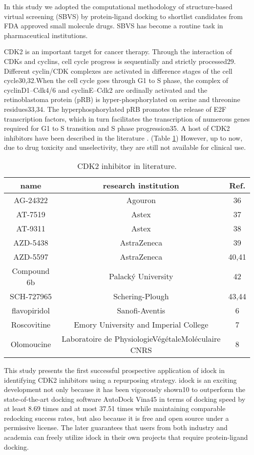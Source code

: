 In this study we adopted the computational methodology of structure-based virtual screening (SBVS) by protein-ligand docking to shortlist candidates from FDA approved small molecule drugs. SBVS has become a routine task in pharmaceutical institutions.

CDK2 is an important target for cancer therapy. Through the interaction of CDKs and cyclins, cell cycle progress is sequentially and strictly processed29. Different cyclin/CDK complexes are activated in difference stages of the cell cycle30,32.When the cell cycle goes through G1 to S phase, the complex of cyclinD1–Cdk4/6 and cyclinE–Cdk2 are ordinally activated and the retinoblastoma protein (pRB) is hyper-phosphorylated on serine and threonine residues33,34. The hyperphosphorylated pRB promotes the release of E2F transcription factors, which in turn facilitates the transcription of numerous genes required for G1 to S transition and S phase progression35. A host of CDK2 inhibitors have been described in the literature . (Table \ref{cdk2:KnownInhibitors}) However, up to now, due to drug toxicity and unselectivity, they are still not available for clinical use.

\begin{table}
\caption{CDK2 inhibitor in literature.}
\label{cdk2:KnownInhibitors}
\begin{tabular}{ccc}
\hline
name & research institution & Ref.\\
\hline
AG-24322 & Agouron & 36\\
AT-7519 & Astex & 37\\
AT-9311 & Astex & 38\\
AZD-5438 & AstraZeneca & 39\\
AZD-5597 & AstraZeneca & 40,41\\
Compound 6b & Palacký University & 42\\
SCH-727965 & Schering-Plough & 43,44\\
flavopiridol & Sanofi-Aventis & 6\\
Roscovitine & Emory University and Imperial College & 7\\
Olomoucine & Laboratoire de PhysiologieVégétaleMoléculaire CNRS & 8\\
\hline
\end{tabular}
\end{table}

This study presents the first successful prospective application of idock \citep{1153,1362} in identifying CDK2 inhibitors using a repurposing strategy. idock is an exciting development not only because it has been vigorously shown10 to outperform the state-of-the-art docking software AutoDock Vina45 in terms of docking speed by at least 8.69 times and at most 37.51 times while maintaining comparable redocking success rates, but also because it is free and open source under a permissive license. The later guarantees that users from both industry and academia can freely utilize idock in their own projects that require protein-ligand docking.


